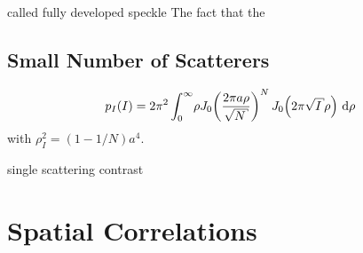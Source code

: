 called fully developed speckle
The fact that the 

\subsection{Small Number of Scatterers}
\begin{equation}
p_I(I) = 2\pi^2 \int_0^\infty\! \rho J_0\!\left(\frac{2\pi a
\rho}{\sqrt{N}}\right)^N J_0\!\left(2\pi\sqrt{I}\rho\right)\md\rho
\end{equation}
with $\rho_I^2=(1-1/N)a^4$.

single scattering
contrast

\section{Spatial Correlations}


